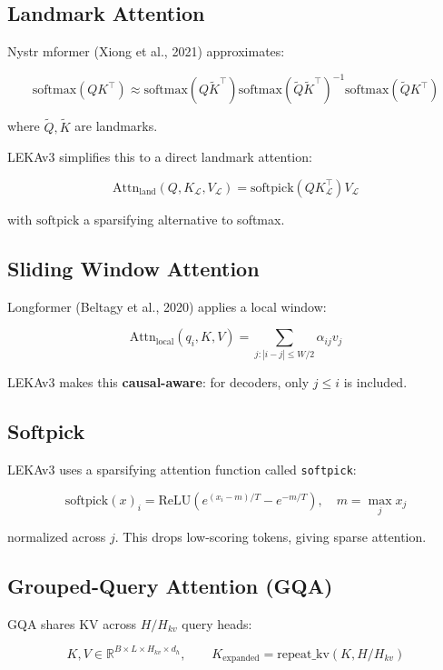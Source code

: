 \subsection{Landmark Attention}

Nystr mformer (Xiong et al., 2021) approximates:

\[
\text{softmax}(QK^\top) \approx \text{softmax}(Q \tilde{K}^\top) \text{softmax}(\tilde{Q} \tilde{K}^\top)^{-1} \text{softmax}(\tilde{Q} K^\top)
\tag{3.6}
\]

where $\tilde{Q}, \tilde{K}$ are landmarks.

LEKAv3 simplifies this to a direct landmark attention:

\[
\text{Attn}_\text{land}(Q, K_\mathcal{L}, V_\mathcal{L}) = \text{softpick}(Q K_\mathcal{L}^\top) V_\mathcal{L}
\tag{3.7}
\]

with $\text{softpick}$ a sparsifying alternative to softmax.

\subsection{Sliding Window Attention}

Longformer (Beltagy et al., 2020) applies a local window:

\[
\text{Attn}_\text{local}(q_i, K, V) = \sum_{j: |i - j| \leq W/2} \alpha_{ij} v_j
\tag{3.8}
\]

LEKAv3 makes this \textbf{causal-aware}: for decoders, only $j \leq i$ is included.

\subsection{Softpick}

LEKAv3 uses a sparsifying attention function called \texttt{softpick}:

\[
\text{softpick}(x)_i = \text{ReLU}\!\left(e^{(x_i - m)/T} - e^{-m/T}\right), \quad m = \max_j x_j
\tag{3.9}
\]

normalized across $j$. This drops low-scoring tokens, giving sparse attention.

\subsection{Grouped-Query Attention (GQA)}

GQA shares KV across $H/H_{kv}$ query heads:

\[
K, V \in \mathbb{R}^{B \times L \times H_{kv} \times d_h}, \qquad
K_{\text{expanded}} = \text{repeat\_kv}(K, H/H_{kv})
\tag{3.10}
\]

